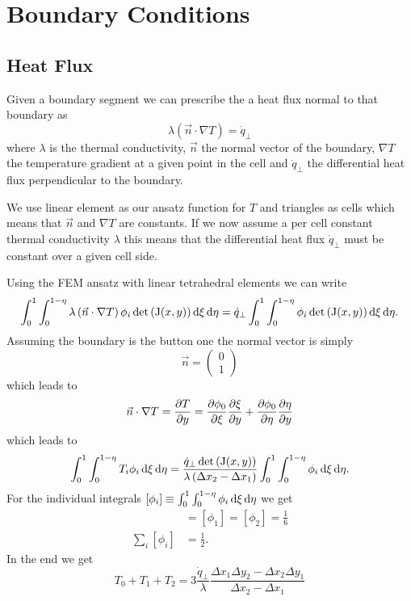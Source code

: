 \chapter{Boundary Conditions}

\section{Heat Flux}
Given a boundary segment we can prescribe the a heat flux normal to that boundary as
\begin{equation}
	\lambda \left(\vec{n} \cdot \nabla T \right) = \dot{q}_{\perp}
\end{equation}
where $\lambda$ is the thermal conductivity, $\vec{n}$ the normal vector of the boundary, $\nabla T$ the temperature gradient at a given point in the cell and $\dot{q}_{\perp}$ the differential heat flux perpendicular to the boundary.

We use linear element as our ansatz function for $T$ and triangles as cells which means that $\vec{n}$ and $\nabla T$ are constants.
If we now assume a per cell constant thermal conductivity $\lambda$ this means that the differential heat flux $\dot{q}_{\perp}$ must be constant over a given cell side.

Using the FEM ansatz with linear tetrahedral elements we can write
\begin{equation}
	\int_0^1 \int_0^{1 - \eta} \lambda \left( \vec{n} \cdot \nabla T \right) \phi_i \det\left( \mathrm{J}(x, y) \right) \mathop{}\!\mathrm{d}{\xi} \mathop{}\!\mathrm{d}{\eta} = \dot{q}_{\perp} \int_0^1 \int_0^{1 - \eta} \phi_i \det\left( \mathrm{J}(x, y) \right) \mathop{}\!\mathrm{d}{\xi} \mathop{}\!\mathrm{d}{\eta}.
\end{equation}
Assuming the boundary is the button one the normal vector is simply
\begin{equation}
	\vec{n} = 
	\begin{pmatrix}
	0\\
	1
	\end{pmatrix}
\end{equation}
which leads to
\begin{equation}
	\vec{n} \cdot \nabla T = \pdv{T}{y} =  \pdv{\phi_0}{\xi}\pdv{\xi}{y} + \pdv{\phi_0}{\eta}\pdv{\eta}{y}
\end{equation}
which leads to
\begin{equation}
	 \int_0^1 \int_0^{1 - \eta} T_i  \phi_i  \mathop{}\!\mathrm{d}{\xi} \mathop{}\!\mathrm{d}{\eta} =  \frac{\dot{q}_{\perp} \det\left( \mathrm{J}(x, y) \right)}{\lambda \left(\Delta x_2 - \Delta x_1 \right)} \int_0^1 \int_0^{1 - \eta} \phi_i  \mathop{}\!\mathrm{d}{\xi} \mathop{}\!\mathrm{d}{\eta}.
\end{equation}
For the individual integrals $[\phi_i] \equiv \int_0^1 \int_0^{1-\eta} \phi_i \mathop{}\!\mathrm{d}{\xi} \mathop{}\!\mathrm{d}{\eta}$ we get
\begin{align}
	[\phi_0] &= [\phi_1] = [\phi_2] = \frac{1}{6} \\
	\sum_i [\phi_i] &= \frac{1}{2}.
\end{align}
In the end we get
\begin{equation}
	T_0 + T_1 + T_2 =  3 \frac{\dot{q}_{\perp}}{\lambda}\frac{\Delta x_1 \Delta y_2 - \Delta x_2 \Delta y_1}{\Delta x_2 - \Delta x_1}
\end{equation}

